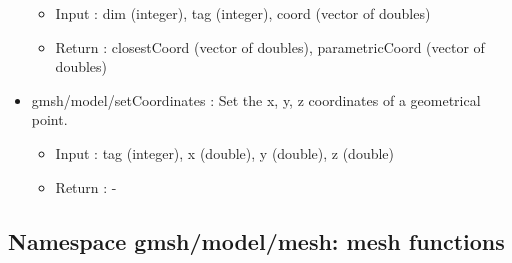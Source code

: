 \documentclass[dvipdfmx, 9pt, a4paper]{article}
\numberwithin{equation}{section}
\begin{document}
\begin{itemize}
\begin{itemize}
\item Input : dim (integer), tag (integer), coord (vector of doubles)
\item Return : closestCoord (vector of doubles), parametricCoord (vector of doubles)
\end{itemize}
\item gmsh/model/setCoordinates : Set the x, y, z coordinates of a geometrical point.
\begin{itemize}
\item Input : tag (integer), x (double), y (double), z (double)
\item Return : -
\end{itemize}
\end{itemize}

\subsection{Namespace gmsh/model/mesh: mesh functions}
\end{document}
